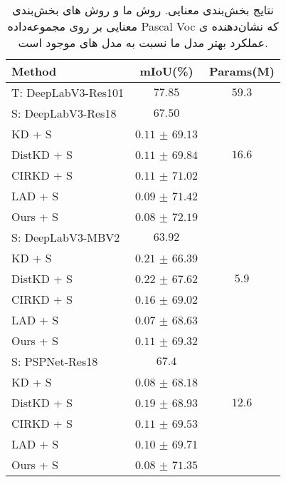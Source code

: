 
\begin{table*}[!htbp]
	\caption[نتایج بخش‌بندی معنایی]{نتایج بخش‌بندی معنایی. روش ما و روش های بخش‌بندی معنایی بر روی مجموعه‌داده Pascal Voc که نشان‌دهنده ی عملکرد بهتر مدل ما نسبت به مدل های موجود است. }
	\begin{center}
    \label{tab:results}
		\begin{tabular}{l c c}
\hline
Method & mIoU(\%) & Params(M) \\
\hline
T: DeepLabV3-Res101 & $77.85$ & $59.3$ \\
\hline
S: DeepLabV3-Res18 & $67.50$ & \\
KD + S & $0.11$ \(\pm\)  $69.13$ & \\
DistKD + S & $0.11$ \(\pm\) $69.84$ & $16.6$ \\
CIRKD + S & $0.11$ \(\pm\) $71.02$ & \\
LAD + S & $0.09$ \(\pm\) $71.42$ & \\
Ours + S & \textbf{$0.08$} \(\pm\) \textbf{$72.19$} & \\
\hline
S: DeepLabV3-MBV2 & $63.92$ & \\
KD + S & $0.21$ \(\pm\) $66.39$ & \\
DistKD + S & $0.22$ \(\pm\) $67.62$ & $5.9$ \\
CIRKD + S & $0.16$ \(\pm\) $69.02$ & \\
LAD + S & $0.07$ \(\pm\) $68.63$ & \\
Ours + S & \textbf{$0.11$} \(\pm\) \textbf{$69.32$} & \\
\hline
S: PSPNet-Res18 & $67.4$ & \\
KD + S & $0.08$ \(\pm\) $68.18$ & \\
DistKD + S & $0.19$ \(\pm\) $68.93$ & $12.6$ \\
CIRKD + S & $0.11$ \(\pm\) $69.53$ & \\
LAD + S & $0.10$ \(\pm\) $69.71$ & \\
Ours + S & \textbf{$0.08$} \(\pm\) \textbf{$71.35$} & \\
\hline
\end{tabular}
		\label{4_tracking_results}
	\end{center}
\end{table*}